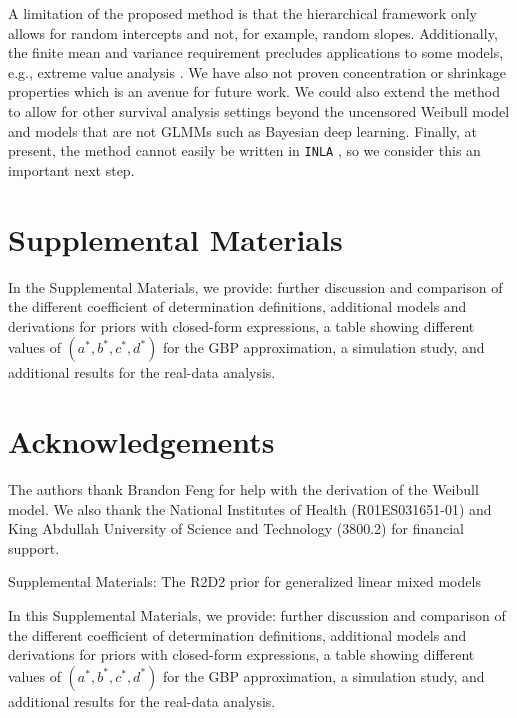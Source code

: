 \documentclass[12pt]{article}
\begin{document}
A limitation of the proposed method is that the hierarchical framework only allows for random intercepts and not, for example, random slopes. Additionally, the finite mean and variance requirement precludes applications to some models, e.g., extreme value analysis \citep{coles2001introduction}. We have also not proven concentration or shrinkage properties which is an avenue for future work. We could also extend the method to allow for other survival analysis settings beyond the uncensored Weibull model and models that are not GLMMs such as Bayesian deep learning. Finally, at present, the method cannot easily be written in \texttt{INLA} \citep{lindgren2015bayesian}, so we consider this an important next step.






\section*{Supplemental Materials}

In the Supplemental Materials, we provide: further discussion and comparison of the different coefficient of determination definitions, additional models and derivations for priors with closed-form expressions, a table showing different values of $(a^*,b^*,c^*,d^*)$ for the GBP approximation, a simulation study, and additional results for the real-data analysis.
\par
\section*{Acknowledgements}
The authors thank Brandon Feng for help with the derivation of the Weibull model. We also thank the National Institutes of Health (R01ES031651-01) and King Abdullah University of Science and Technology (3800.2) for financial support.







\begin{center}
{\Large Supplemental Materials: The R2D2 prior for generalized linear mixed models}
\end{center}


In this Supplemental Materials, we provide: further discussion and comparison of the different coefficient of determination definitions, additional models and derivations for priors with closed-form expressions, a table showing different values of $(a^*,b^*,c^*,d^*)$ for the GBP approximation, a simulation study, and additional results for the real-data analysis.
\end{document}

